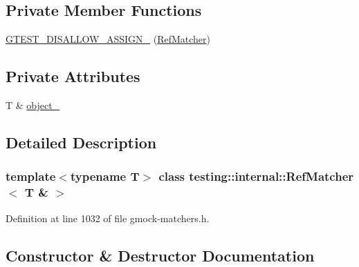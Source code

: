 \subsection*{Private Member Functions}
\begin{DoxyCompactItemize}
\item 
\hyperlink{classtesting_1_1internal_1_1RefMatcher_3_01T_01_6_01_4_ac4c1d183a43743e39fa9334cfa184a46}{G\+T\+E\+S\+T\+\_\+\+D\+I\+S\+A\+L\+L\+O\+W\+\_\+\+A\+S\+S\+I\+G\+N\+\_\+} (\hyperlink{classtesting_1_1internal_1_1RefMatcher}{Ref\+Matcher})
\end{DoxyCompactItemize}
\subsection*{Private Attributes}
\begin{DoxyCompactItemize}
\item 
T \& \hyperlink{classtesting_1_1internal_1_1RefMatcher_3_01T_01_6_01_4_a459e1fb16e9279031436dbdf1fcce6bd}{object\+\_\+}
\end{DoxyCompactItemize}


\subsection{Detailed Description}
\subsubsection*{template$<$typename T$>$\newline
class testing\+::internal\+::\+Ref\+Matcher$<$ T \& $>$}



Definition at line 1032 of file gmock-\/matchers.\+h.



\subsection{Constructor \& Destructor Documentation}
\mbox{\label{classtesting_1_1internal_1_1RefMatcher_3_01T_01_6_01_4_a94eaec01f11b3ed704092a62cdb9c21c}} 
